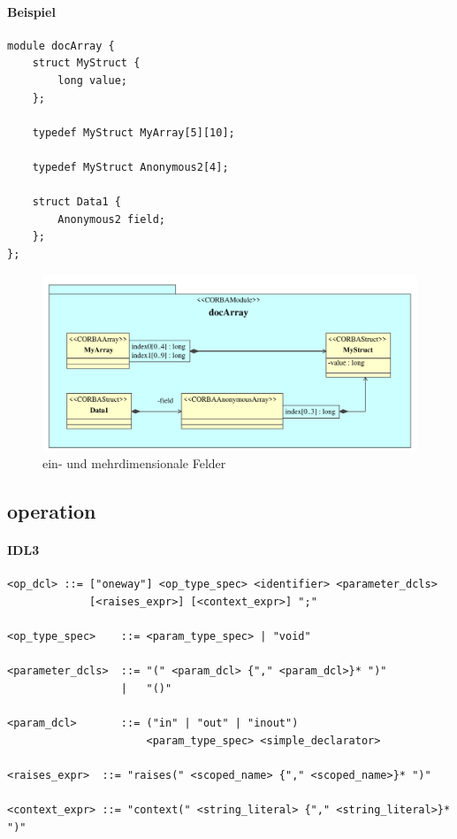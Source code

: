 \documentclass [a4paper,10pt] {scrartcl}
\begin{document}
\paragraph{Beispiel}
\begin{verbatim}
module docArray {
    struct MyStruct {
        long value;
    };

    typedef MyStruct MyArray[5][10];

    typedef MyStruct Anonymous2[4];

    struct Data1 {
        Anonymous2 field;
    };
};
\end{verbatim}
\begin{figure}[!h]
\centerline{\includegraphics[width=1.2\linewidth]{docArray}}
\caption{ein- und mehrdimensionale Felder}
\label{fig:array}
\end{figure}

\cleardoublepage
\subsection{operation}
\paragraph{IDL3}
\begin{verbatim}
<op_dcl> ::= ["oneway"] <op_type_spec> <identifier> <parameter_dcls>
             [<raises_expr>] [<context_expr>] ";"

<op_type_spec>    ::= <param_type_spec> | "void"

<parameter_dcls>  ::= "(" <param_dcl> {"," <param_dcl>}* ")"
                  |   "()"

<param_dcl>       ::= ("in" | "out" | "inout")
                      <param_type_spec> <simple_declarator>

<raises_expr>  ::= "raises(" <scoped_name> {"," <scoped_name>}* ")"

<context_expr> ::= "context(" <string_literal> {"," <string_literal>}* ")"
\end{verbatim}
\end{document}
